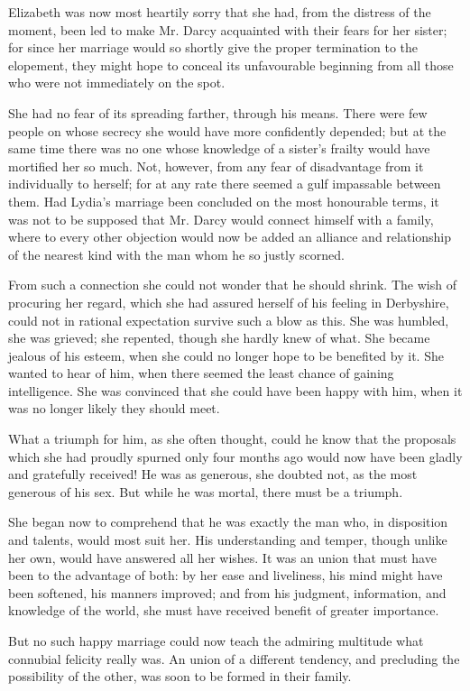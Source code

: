 Elizabeth was now most heartily sorry that she had, from the distress of the moment, been led to make Mr. Darcy acquainted with their fears for her sister; for since her marriage would so shortly give the proper termination to the elopement, they might hope to conceal its unfavourable beginning from all those who were not immediately on the spot.

She had no fear of its spreading farther, through his means. There were few people on whose secrecy she would have more confidently depended; but at the same time there was no one whose knowledge of a sister's frailty would have mortified her so much. Not, however, from any fear of disadvantage from it individually to herself; for at any rate there seemed a gulf impassable between them. Had Lydia's marriage been concluded on the most honourable terms, it was not to be supposed that Mr. Darcy would connect himself with a family, where to every other objection would now be added an alliance and relationship of the nearest kind with the man whom he so justly scorned.

From such a connection she could not wonder that he should shrink. The wish of procuring her regard, which she had assured herself of his feeling in Derbyshire, could not in rational expectation survive such a blow as this. She was humbled, she was grieved; she repented, though she hardly knew of what. She became jealous of his esteem, when she could no longer hope to be benefited by it. She wanted to hear of him, when there seemed the least chance of gaining intelligence. She was convinced that she could have been happy with him, when it was no longer likely they should meet.

What a triumph for him, as she often thought, could he know that the proposals which she had proudly spurned only four months ago would now have been gladly and gratefully received! He was as generous, she doubted not, as the most generous of his sex. But while he was mortal, there must be a triumph.

She began now to comprehend that he was exactly the man who, in disposition and talents, would most suit her. His understanding and temper, though unlike her own, would have answered all her wishes. It was an union that must have been to the advantage of both: by her ease and liveliness, his mind might have been softened, his manners improved; and from his judgment, information, and knowledge of the world, she must have received benefit of greater importance.

But no such happy marriage could now teach the admiring multitude what connubial felicity really was. An union of a different tendency, and precluding the possibility of the other, was soon to be formed in their family.

